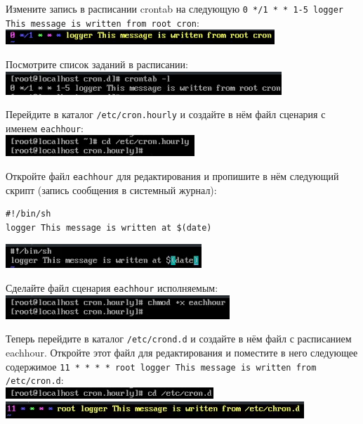\documentclass{beamer}
\begin{document}
\begin{frame}[plain]
	Измените запись в расписании crontab на следующую \texttt{0 */1 * * 1-5 logger This message is written from root cron}:
	\\\includegraphics{6.png}
\end{frame}
\begin{frame}[plain]
	Посмотрите список заданий в расписании:
	\\\includegraphics{7.png}
\end{frame}
\begin{frame}[plain]
	Перейдите в каталог \texttt{/etc/cron.hourly} и создайте в нём файл сценария с именем \texttt{eachhour}:
	\\\includegraphics{8.png}
\end{frame}
\begin{frame}
	Откройте файл \texttt{eachhour} для редактирования и пропишите в нём следующий скрипт (запись сообщения в системный журнал):
	\begin{verbatim}
#!/bin/sh
logger This message is written at $(date)
  \end{verbatim}

	\includegraphics{9.png}
\end{frame}
\begin{frame}[plain]
	Сделайте файл сценария \texttt{eachhour} исполняемым:
	\\\includegraphics{10.png}
\end{frame}
\begin{frame}[plain]
	Теперь перейдите в каталог \texttt{/etc/crond.d} и создайте в нём файл с расписанием eachhour. Откройте этот файл для редактирования и поместите в него следующее содержимое \texttt{11 * * * * root logger This message is written from /etc/cron.d}:
	\\\includegraphics{11.png}
	\\\includegraphics{12.png}
\end{frame}
\end{document}
